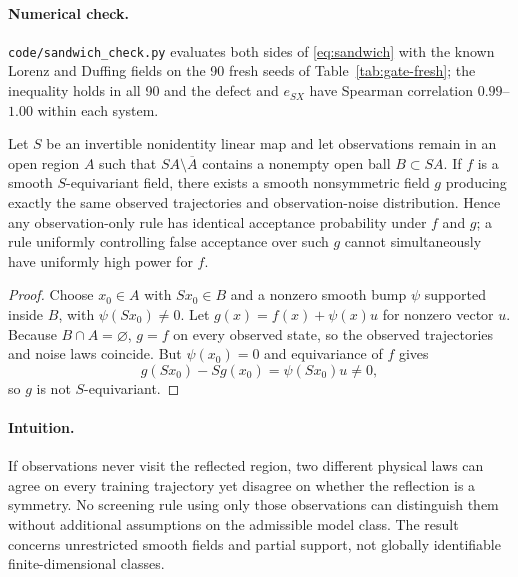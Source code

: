 \paragraph{Numerical check.} \texttt{code/sandwich\_check.py} evaluates both sides of \eqref{eq:sandwich} with the known Lorenz and Duffing fields on the 90 fresh seeds of Table~\ref{tab:gate-fresh}; the inequality holds in all 90 and the defect and $e_{SX}$ have Spearman correlation $0.99$--$1.00$ within each system.

\begin{proposition}
Let $S$ be an invertible nonidentity linear map and let observations remain in an open region $A$ such that $SA\setminus\overline A$ contains a nonempty open ball $B\subset SA$. If $f$ is a smooth $S$-equivariant field, there exists a smooth nonsymmetric field $g$ producing exactly the same observed trajectories and observation-noise distribution. Hence any observation-only rule has identical acceptance probability under $f$ and $g$; a rule uniformly controlling false acceptance over such $g$ cannot simultaneously have uniformly high power for $f$.
\end{proposition}
\begin{proof}
Choose $x_0\in A$ with $Sx_0\in B$ and a nonzero smooth bump $\psi$ supported inside $B$, with $\psi(Sx_0)\neq0$. Let $g(x)=f(x)+\psi(x)u$ for nonzero vector $u$. Because $B\cap A=\varnothing$, $g=f$ on every observed state, so the observed trajectories and noise laws coincide. But $\psi(x_0)=0$ and equivariance of $f$ gives
\[
g(Sx_0)-Sg(x_0)=\psi(Sx_0)u\neq0,
\]
so $g$ is not $S$-equivariant.
\end{proof}
\paragraph{Intuition.} If observations never visit the reflected region, two different physical laws can agree on every training trajectory yet disagree on whether the reflection is a symmetry. No screening rule using only those observations can distinguish them without additional assumptions on the admissible model class.
The result concerns unrestricted smooth fields and partial support, not globally identifiable finite-dimensional classes.


